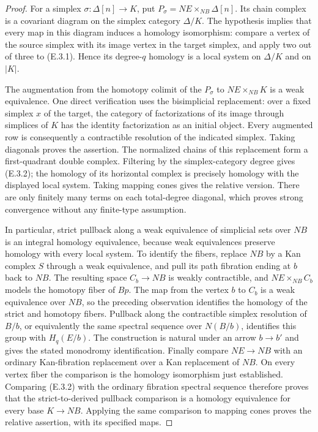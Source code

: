 \begin{proof}
For a simplex $\sigma:\Delta[n]\to K$, put
$P_\sigma=NE\times_{NB}\Delta[n]$. Its chain complex is a covariant
diagram on the simplex category $\Delta/K$. The hypothesis implies
that every map in this diagram induces a homology isomorphism:
compare a vertex of the source simplex with its image vertex in the
target simplex, and apply two out of three to (E.3.1). Hence its
degree-$q$ homology is a local system on $\Delta/K$ and on $|K|$.

The augmentation from the homotopy colimit of the $P_\sigma$ to
$NE\times_{NB}K$ is a weak equivalence. One direct verification uses
the bisimplicial replacement: over a fixed simplex $x$ of the target,
the category of factorizations of its image through simplices of $K$
has the identity factorization as an initial object. Every augmented
row is consequently a contractible resolution of the indicated
simplex. Taking diagonals proves the assertion. The normalized chains
of this replacement form a first-quadrant double complex. Filtering
by the simplex-category degree gives (E.3.2); the homology of its
horizontal complex is precisely homology with the displayed local
system. Taking mapping cones gives the relative version. There are
only finitely many terms on each total-degree diagonal, which proves
strong convergence without any finite-type assumption.

In particular, strict pullback along a weak equivalence of simplicial
sets over $NB$ is an integral homology equivalence, because weak
equivalences preserve homology with every local system. To identify
the fibers, replace $NB$ by a Kan complex $S$ through a weak equivalence,
and pull its path fibration ending at $b$ back to $NB$. The resulting
space $C_b\to NB$ is weakly contractible, and
$NE\times_{NB}C_b$ models the homotopy fiber of $Bp$. The map from the
vertex $b$ to $C_b$ is a weak equivalence over $NB$, so the preceding
observation identifies the homology of the strict and homotopy fibers.
Pullback along the contractible simplex resolution of $B/b$, or
equivalently the same spectral sequence over $N(B/b)$, identifies
this group with $H_q(E/b)$. The construction is natural under an arrow
$b\to b'$ and gives the stated monodromy identification. Finally compare
$NE\to NB$ with an ordinary Kan-fibration replacement over a Kan
replacement of $NB$. On every vertex fiber the comparison is the
homology isomorphism just established. Comparing (E.3.2) with the
ordinary fibration spectral sequence therefore proves that the
strict-to-derived pullback comparison is a homology equivalence for
every base $K\to NB$. Applying the same comparison to mapping cones
proves the relative assertion, with its specified maps.
\end{proof}

